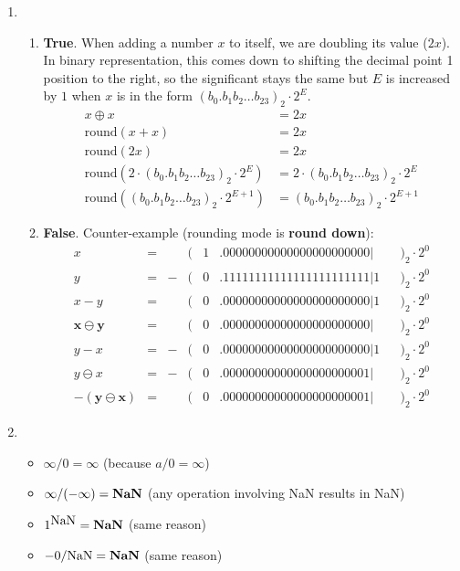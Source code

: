 \documentclass{article}
\begin{document}
\begin{enumerate}
\item \begin{enumerate}
\item \textbf{True}. When adding a number $x$ to itself, we are doubling its value ($2x$). In binary representation, this comes down to shifting the decimal point 1 position to the right, so the significant stays the same but $E$ is increased by $1$ when $x$ is in the form $(b_0 . b_1 b_2 \dotso b_{23})_2 \cdot 2^E$.
\begin{align*}
x \oplus x &= 2x \\
\mbox{round}(x + x) &= 2x \\
\mbox{round}(2x) &= 2x \\
\mbox{round}(2 \cdot (b_0 . b_1 b_2 \dotso b_{23})_2 \cdot 2^E) &= 2 \cdot (b_0 . b_1 b_2 \dotso b_{23})_2 \cdot 2^E \\
\mbox{round}((b_0 . b_1 b_2 \dotso b_{23})_2 \cdot 2^{E+1}) &= (b_0 . b_1 b_2 \dotso b_{23})_2 \cdot 2^{E+1}
\end{align*}
\item \textbf{False}. Counter-example (rounding mode is \textbf{round down}):
\begin{align*}
x&= & &(  &  1&.00000000000000000000000|  &  &)_2 \cdot 2^0 \\
y&= & -&(  &  0&.11111111111111111111111|1  &  &)_2 \cdot 2^0 \\
x-y&= & &(  &  0&.00000000000000000000000|1  &  &)_2 \cdot 2^0 \\
\boldsymbol{x \ominus y} &= & &(  &  0&.00000000000000000000000|  &  &)_2 \cdot 2^0\\
y-x&= & -&(  &  0&.00000000000000000000000|1  &  &)_2 \cdot 2^0 \\
y \ominus x &= & -&(  &  0&.00000000000000000000001|  &  &)_2 \cdot 2^0 \\
\boldsymbol{-(y \ominus x)} &= & &(  &  0&.00000000000000000000001|  &  &)_2 \cdot 2^0
\end{align*}
\end{enumerate}
\item \begin{itemize}
\item $\infty / 0 = \boldsymbol{\infty}$ (because $a/0=\infty$)
\item $\infty / (- \infty) = \mbox{\textbf{NaN}}$ (any operation involving NaN results in NaN)
\item $1^{\mbox{NaN}} = \mbox{\textbf{NaN}}$ (same reason)
\item $-0/\mbox{NaN} = \mbox{\textbf{NaN}}$ (same reason)

\end{itemize}

\end{enumerate}
\end{document}
